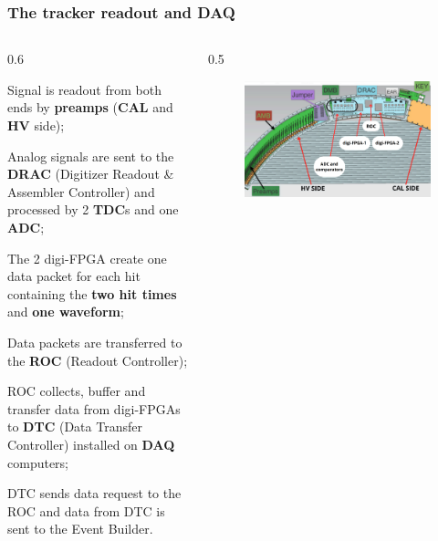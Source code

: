 \documentclass{beamer}
\begin{document}
\begin{frame}
    \frametitle{The tracker readout and DAQ}
    \vspace{-6mm}
    \begin{columns}
         \begin{column}{0.6\framewidth}
         \setlength{\leftmargini}{1em}
         \begin{itemize}
         {\small
         \item Signal is readout from both ends by  \textbf{preamps} (\textbf{CAL} and \textbf{HV} side);
         \item Analog signals are sent to the \textbf{DRAC} {\footnotesize(Digitizer Readout \& Assembler Controller)} and processed by 2 \textbf{TDC}s and one \textbf{ADC};
        \item The 2 digi-FPGA create one data packet for each hit containing the \textbf{two hit times} and \textbf{one waveform};
        \item Data packets are transferred to the \textbf{ROC} {\footnotesize(Readout Controller)};
        \item ROC collects, buffer and transfer data from digi-FPGAs to \textbf{DTC} {\footnotesize(Data Transfer Controller)} installed on \textbf{DAQ} computers;
        \item DTC sends data request to the ROC and data from DTC is sent to the Event Builder.}
         \end{itemize}
    \end{column}
    \begin{column}{0.5\framewidth}
           \begin{figure}[h]
          \centering
                    \hspace*{-1.2em}
            \includegraphics[width=1.1\columnwidth]{figures/png/Screenshot_20240919_110354.png}

\end{figure}
\end{column}
\end{columns}
\end{frame}
\end{document}
